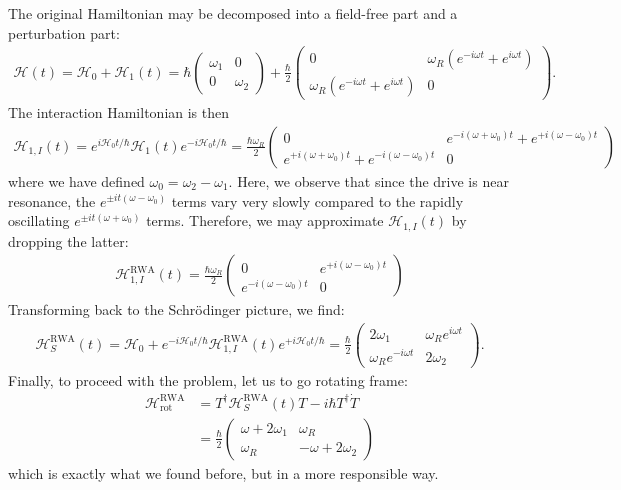 \documentclass{article}
\theoremstyle{definition}
\newcommand{\ham}{\mathcal{H}}
\newcommand{\f}[2]{\frac{#1}{#2}}
\begin{document}
\begin{enumerate}[label=\alph*)]
	The original Hamiltonian may be decomposed into a field-free part and a perturbation part: 
	\begin{align*}
	\ham(t) = \ham_0 + \ham_1(t) = \hbar \begin{pmatrix}
	\omega_1 & 0 \\ 0 & \omega_2
	\end{pmatrix} + \f{\hbar}{2} \begin{pmatrix}
	0 & \omega_R (e^{-i\omega t} + e^{i\omega t}) \\ \omega_R (e^{-i\omega t} + e^{i\omega t}) & 0
	\end{pmatrix}.
	\end{align*}
	The interaction Hamiltonian is then 
	\begin{align*}
	\ham_{1,I}(t) = e^{i\ham_0 t/\hbar} \ham_{1}(t) e^{-i\ham_0 t/\hbar} = 
	\f{\hbar\omega_R}{2}\begin{pmatrix}
	0 & e^{-i(\omega + \omega_0)t} + e^{+i(\omega - \omega_0)t}   
	\\ 
	e^{+i(\omega + \omega_0)t} + e^{-i(\omega - \omega_0)t} & 0
	\end{pmatrix}
	\end{align*}
	where we have defined $\omega_0 = \omega_2 - \omega_1$. Here, we observe that since the drive is near resonance, the $e^{\pm it(\omega - \omega_0)}$ terms vary very slowly compared to the rapidly oscillating $e^{\pm it(\omega+\omega_0)}$ terms. Therefore, we may approximate $\ham_{1,I}(t)$ by dropping the latter:
	\begin{align*}
	\ham_{1,I}^{\text{RWA}}(t) = \f{\hbar\omega_R}{2}\begin{pmatrix}
	0 & e^{+i(\omega - \omega_0)t}   
	\\ 
	e^{-i(\omega - \omega_0)t} & 0
	\end{pmatrix}
	\end{align*}
	Transforming back to the Schr\"{o}dinger picture, we find:
	\begin{align*}
	\ham_S^\text{RWA}(t) = \ham_0 + e^{-i\ham_0 t/\hbar} \ham_{1,I}^{\text{RWA}}(t) e^{+i\ham_0 t/\hbar} = \f{\hbar}{2}\begin{pmatrix}
	2\omega_1 & \omega_R e^{i\omega t} \\ \omega_R e^{-i\omega t} & 2\omega_2
	\end{pmatrix}.
	\end{align*}
	Finally, to proceed with the problem, let us to go rotating frame:
	\begin{align*}
	\boxed{\ham_\text{rot}^\text{RWA}} &= T^\dagger \ham_S^\text{RWA}(t) T -i\hbar T^\dagger \dot T \\
	&= \boxed{\f{\hbar}{2} \begin{pmatrix}
	\omega + 2 \omega_1 & \omega_R \\ \omega_R & - \omega + 2\omega_2
	\end{pmatrix}}
	\end{align*}
	which is exactly what we found before, but in a more responsible way. 
	

\end{enumerate}
\end{document}

